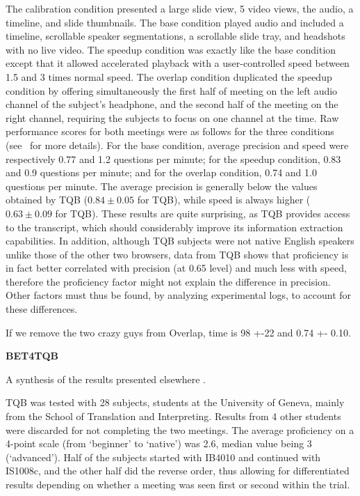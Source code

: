 \documentclass[11pt]{article}
\begin{document}
The calibration condition presented a large slide view, 5 video views, the audio, a timeline, and slide thumbnails.  The base condition played audio and included a timeline, scrollable speaker segmentations, a scrollable slide tray, and headshots with no live video.  The speedup condition was exactly like the base condition except that it allowed accelerated playback with a user-controlled speed between 1.5 and 3 times normal speed.  The overlap condition duplicated the speedup condition by offering simultaneously the first half of meeting on the left audio channel of the subject's headphone, and the second half of the meeting on the right channel, requiring the subjects to focus on one channel at the time.
Raw performance scores for both meetings were as follows for the three conditions (see~\cite[Section~3]{ami-d64} for more details).  For the base condition, average precision and speed were respectively 0.77 and 1.2 questions per minute; for the speedup condition, 0.83 and 0.9 questions per minute; and for the overlap condition, 0.74 and 1.0 questions per minute.  The average precision is generally below the values obtained by TQB ($0.84\pm0.05$ for TQB), while speed is always higher ($0.63\pm0.09$ for TQB).  These results are quite surprising, as TQB provides access to the transcript, which should considerably improve its information extraction capabilities.  In addition, although TQB subjects were not native English speakers unlike those of the other two browsers, data from TQB shows that proficiency is in fact better correlated with precision (at 0.65 level) and much less with speed, therefore the proficiency factor might not explain the difference in precision.  Other factors must thus be found, by analyzing experimental logs, to account for these differences.

If we remove the two crazy guys from Overlap, time is 98 +-22 and 0.74 +- 0.10.


\textbf{BET4TQB}

A synthesis of the results presented elsewhere \cite{popescubelis-mlmi07,popescubelis-lrec08}.

TQB was tested with 28 subjects, students at the University of Geneva, mainly from the School of Translation and Interpreting.  Results from 4 other students were discarded for not completing the two meetings.  The average proficiency on a 4-point scale (from `beginner' to `native') was 2.6, median value being 3 (`advanced').  Half of the subjects started with IB4010 and continued with IS1008c, and the other half did the reverse order, thus allowing for differentiated results depending on whether a meeting was seen first or second within the trial.
\end{document}
